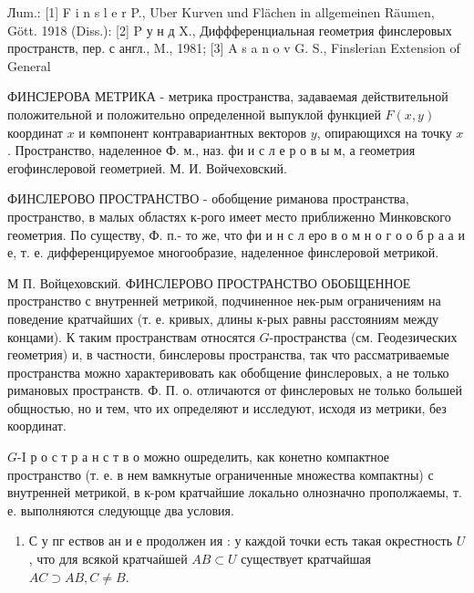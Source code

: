 \documentclass[10pt]{article}
\begin{document}
Лum.: [1] F i n s l e r P., Uber Kurven und Flächen in allgemeinen Räumen, Gött. 1918 (Diss.): [2] P у н д X., Диффференциальная геометрия финслеровых пространств, пер. с англ., M., 1981; [3] A s a n o v G. S., Finslerian Extension of General



ФИНС̈ЈЕРОВА МЕТРИКА - метрика пространства, задаваемая действительной положительной и положительно определенной выпуклой функцией $F(x, y)$ координат $x$ и көмпонент контравариантных векторов $y$, опирающихся на точку $x$. Пространство, наделенное Ф. м., наз. фи и с л е р о в ы м, а геометрия егофинслеровой геометрией. М. И. Войчеховский.



ФИНСЛЕРОВО ПРОСТРАНСТВО - обобщение риманова пространства, пространство, в малых областях к-рого имеет место приближенно Минковского геометрия. По существу, Ф. п.- то же, что фи и н с л еро в о м н о г о о б р а $а$ и е, т. е. дифференцируемое многообразие, наделенное финслеровой метрикой.



М П. Войцеховский. ФИНСЛЕРОВО ПРОСТРАНСТВО ОБОБЩЕННОЕ пространство с внутренней метрикой, подчиненное нек-рым ограничениям на поведение кратчайших (т. е. кривых, длины к-рых равны расстояниям между концами). К таким пространствам относятся $G$-пространства (см. Геодезических геометрия) и, в частности, бинслеровы пространства, так что рассматриваемые пространства можно характеривовать как обобщение финслеровых, а не только римановых пространств. Ф. П. о. отличаются от финслеровых не только большей общностью, но и тем, что их определяют и исследуют, исходя из метрики, без координат.



$G$-I р о с т р а н с т в о можно ошределить, как конетно компактное пространство (т. е. в нем вамкнутые ограниченные множества компактны) с внутренней метрикой, в к-ром кратчайшие локально олнозначно прополжаемы, т. е. выполняются следующце два условия.



\begin{enumerate}

  \item С у пг ествов ан и е продолжен ия : у каждой точки есть такая окрестность $U$, что для всякой кратчаӥшей $A B \subset U$ существует кратчайшая $A C \supset A B, C \neq B$.

\end{enumerate}
\end{document}
